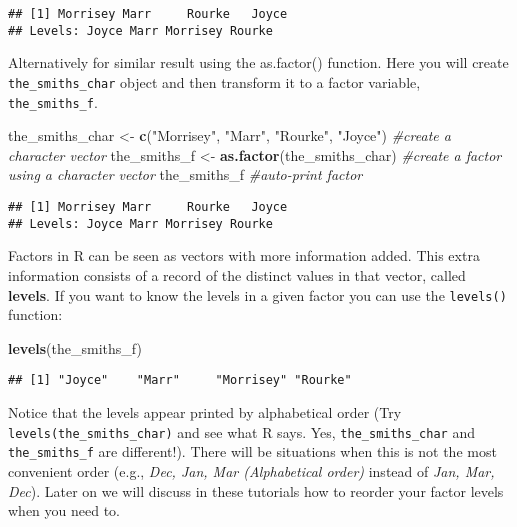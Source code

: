 \documentclass[
]{book}
\newenvironment{Shaded}{\begin{snugshade}}{\end{snugshade}}
\newcommand{\CommentTok}[1]{\textcolor[rgb]{0.56,0.35,0.01}{\textit{#1}}}
\newcommand{\FunctionTok}[1]{\textcolor[rgb]{0.13,0.29,0.53}{\textbf{#1}}}
\newcommand{\NormalTok}[1]{#1}
\newcommand{\OtherTok}[1]{\textcolor[rgb]{0.56,0.35,0.01}{#1}}
\newcommand{\StringTok}[1]{\textcolor[rgb]{0.31,0.60,0.02}{#1}}
\begin{document}
\begin{verbatim}
## [1] Morrisey Marr     Rourke   Joyce   
## Levels: Joyce Marr Morrisey Rourke
\end{verbatim}

Alternatively for similar result using the as.factor() function. Here you will create \texttt{the\_smiths\_char} object and then transform it to a factor variable, \texttt{the\_smiths\_f}.

\begin{Shaded}
\begin{Highlighting}[]
\NormalTok{the\_smiths\_char }\OtherTok{\textless{}{-}} \FunctionTok{c}\NormalTok{(}\StringTok{"Morrisey"}\NormalTok{, }\StringTok{"Marr"}\NormalTok{, }\StringTok{"Rourke"}\NormalTok{, }\StringTok{"Joyce"}\NormalTok{) }\CommentTok{\#create a character vector}
\NormalTok{the\_smiths\_f }\OtherTok{\textless{}{-}} \FunctionTok{as.factor}\NormalTok{(the\_smiths\_char) }\CommentTok{\#create a factor using a character vector}
\NormalTok{the\_smiths\_f }\CommentTok{\#auto{-}print factor}
\end{Highlighting}
\end{Shaded}

\begin{verbatim}
## [1] Morrisey Marr     Rourke   Joyce   
## Levels: Joyce Marr Morrisey Rourke
\end{verbatim}

Factors in R can be seen as vectors with more information added. This extra information consists of a record of the distinct values in that vector, called \textbf{levels}. If you want to know the levels in a given factor you can use the \texttt{levels()} function:

\begin{Shaded}
\begin{Highlighting}[]
\FunctionTok{levels}\NormalTok{(the\_smiths\_f)}
\end{Highlighting}
\end{Shaded}

\begin{verbatim}
## [1] "Joyce"    "Marr"     "Morrisey" "Rourke"
\end{verbatim}

Notice that the levels appear printed by alphabetical order (Try \texttt{levels(the\_smiths\_char)} and see what R says. Yes, \texttt{the\_smiths\_char} and \texttt{the\_smiths\_f} are different!). There will be situations when this is not the most convenient order (e.g., \emph{Dec, Jan, Mar (Alphabetical order)} instead of \emph{Jan, Mar, Dec}). Later on we will discuss in these tutorials how to reorder your factor levels when you need to.
\end{document}
